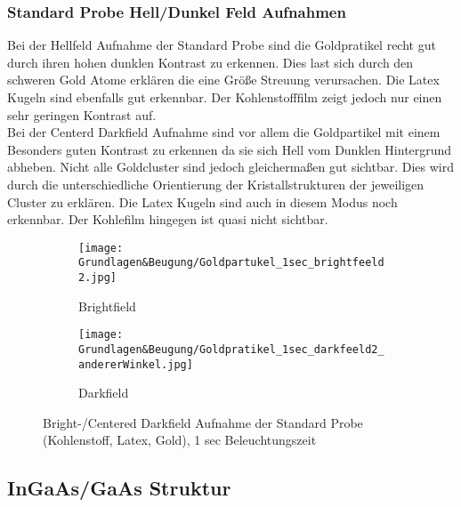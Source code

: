 \subsubsection{Standard Probe Hell/Dunkel Feld Aufnahmen}
Bei der Hellfeld Aufnahme der Standard Probe sind die Goldpratikel recht gut durch ihren hohen dunklen Kontrast zu erkennen. Dies last sich durch den schweren Gold Atome erklären die eine Größe Streuung verursachen. Die Latex Kugeln sind ebenfalls gut erkennbar. Der Kohlenstofffilm zeigt jedoch nur einen sehr geringen Kontrast auf.\\
Bei der Centerd Darkfield Aufnahme sind vor allem die Goldpartikel mit einem Besonders guten Kontrast zu erkennen da sie sich Hell vom Dunklen Hintergrund abheben. Nicht alle Goldcluster sind jedoch gleichermaßen gut sichtbar. Dies wird durch die unterschiedliche Orientierung der Kristallstrukturen der jeweiligen Cluster zu erklären. Die Latex Kugeln sind auch in diesem Modus noch erkennbar. Der Kohlefilm hingegen ist quasi nicht sichtbar. 

\begin{figure}
     \centering
     \begin{subfigure}[b]{0.49\textwidth}
         \centering
         \texttt{[image: Grundlagen\&Beugung/Goldpartukel\_1sec\_brightfeeld2.jpg]}
         \caption{Brightfield}
         \label{SPBF}
     \end{subfigure}
     \hfill
     \begin{subfigure}[b]{0.49\textwidth}
         \centering
         \texttt{[image: Grundlagen\&Beugung/Goldpratikel\_1sec\_darkfeeld2\_andererWinkel.jpg]}
         \caption{Darkfield}
         \label{SPDF}
     \end{subfigure}
        \caption{Bright-/Centered Darkfield Aufnahme der Standard Probe (Kohlenstoff, Latex, Gold), 1 sec Beleuchtungszeit}
        \label{SPBF&DF}
\end{figure}

\subsection{InGaAs/GaAs Struktur}

